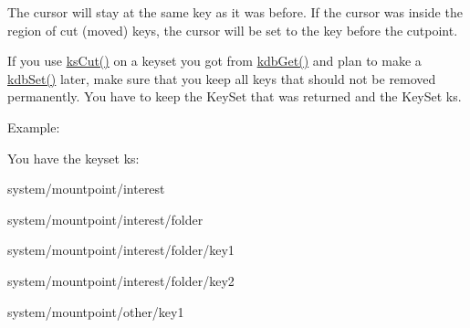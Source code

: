 The cursor will stay at the same key as it was before. If the cursor was inside the region of cut (moved) keys, the cursor will be set to the key before the cutpoint.

If you use \mbox{\hyperlink{group__keyset_ga6b00cf82b59af4d883a9bad6cf4a4a4a}{ks\+Cut()}} on a keyset you got from \mbox{\hyperlink{group__kdb_ga28e385fd9cb7ccfe0b2f1ed2f62453a1}{kdb\+Get()}} and plan to make a \mbox{\hyperlink{group__kdb_ga11436b058408f83d303ca5e996832bcf}{kdb\+Set()}} later, make sure that you keep all keys that should not be removed permanently. You have to keep the Key\+Set that was returned and the Key\+Set {\ttfamily ks}.

\begin{DoxyParagraph}{Example\+:}

\end{DoxyParagraph}
You have the keyset {\ttfamily ks\+:} 
\begin{DoxyItemize}
\item {\ttfamily system/mountpoint/interest} 
\item {\ttfamily system/mountpoint/interest/folder} 
\item {\ttfamily system/mountpoint/interest/folder/key1} 
\item {\ttfamily system/mountpoint/interest/folder/key2} 
\item {\ttfamily system/mountpoint/other/key1} 
\end{DoxyItemize}

